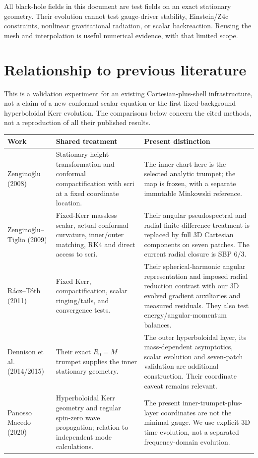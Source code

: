 \documentclass[11pt,letterpaper]{article}
\begin{document}
All black-hole fields in this document are test fields on an exact stationary geometry. Their evolution cannot test gauge-driver stability, Einstein/Z4c constraints, nonlinear gravitational radiation, or scalar backreaction. Reusing the mesh and interpolation is useful numerical evidence, with that limited scope.

\clearpage
\section{Relationship to previous literature}
This is a validation experiment for an existing Cartesian-plus-shell infrastructure, not a claim of a new conformal scalar equation or the first fixed-background hyperboloidal Kerr evolution. The comparisons below concern the cited methods, not a reproduction of all their published results.

\begin{center}\small
\begin{tabularx}{\linewidth}{@{}p{3.0cm}X X@{}}\toprule
Work & Shared treatment & Present distinction \\\midrule
Zengino\u glu (2008) \cite{scrifixing} & Stationary height transformation and conformal compactification with scri at a fixed coordinate location. & The inner chart here is the selected analytic trumpet; the map is frozen, with a separate immutable Minkowski reference. \\
Zengino\u glu--Tiglio (2009) \cite{matching} & Fixed-Kerr massless scalar, actual conformal curvature, inner/outer matching, RK4 and direct access to scri. & Their angular pseudospectral and radial finite-difference treatment is replaced by full 3D Cartesian components on seven patches. The current radial closure is SBP $6/3$. \\
R\'acz--T\'oth (2011) \cite{tails} & Fixed Kerr, compactification, scalar ringing/tails, and convergence tests. & Their spherical-harmonic angular representation and imposed radial reduction contrast with our 3D evolved gradient auxiliaries and measured residuals. They also test energy/angular-momentum balances. \\
Dennison et al. (2014/2015) \cite{trumpet} & Their exact $R_0=M$ trumpet supplies the inner stationary geometry. & The outer hyperboloidal layer, its mass-dependent asymptotics, scalar evolution and seven-patch validation are additional construction. Their coordinate caveat remains relevant. \\
Panosso Macedo (2020) \cite{macedo} & Hyperboloidal Kerr geometry and regular spin-zero wave propagation; relation to independent mode calculations. & The present inner-trumpet-plus-layer coordinates are not the minimal gauge. We use explicit 3D time evolution, not a separated frequency-domain evolution. \\\bottomrule
\end{tabularx}\end{center}
\end{document}
